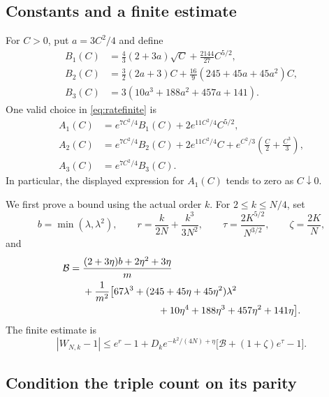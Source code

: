 \documentclass[11pt]{article}
\theoremstyle{definition}
\theoremstyle{remark}
\newcommand{\1}{\mathbf 1}
\begin{document}
\subsection{Constants and a finite estimate}

For $C>0$, put $a=3C^2/4$ and define
\begin{equation}\label{eq:rateconstantsB}
\begin{aligned}
B_1(C)&=\frac43(2+3a)\sqrt C+\frac{2144}{27}C^{5/2},\\
B_2(C)&=\frac32(2a+3)C
+\frac{16}{9}(245+45a+45a^2)C,\\
B_3(C)&=3(10a^3+188a^2+457a+141).
\end{aligned}
\end{equation}
One valid choice in \eqref{eq:ratefinite} is
\begin{equation}\label{eq:rateconstantsA}
\begin{aligned}
A_1(C)&=e^{7C^2/4}B_1(C)+2e^{11C^2/4}C^{5/2},\\
A_2(C)&=e^{7C^2/4}B_2(C)+2e^{11C^2/4}C
+e^{C^2/3}\left(\frac C2+\frac{C^3}{3}\right),\\
A_3(C)&=e^{7C^2/4}B_3(C).
\end{aligned}
\end{equation}
In particular, the displayed expression for $A_1(C)$ tends to zero as $C\downarrow0$.

We first prove a bound using the actual order $k$. For $2\le k\le N/4$, set
\[
b=\min(\lambda,\lambda^2),\qquad
r=\frac{k}{2N}+\frac{k^3}{3N^2},\qquad
\tau=\frac{2K^{5/2}}{N^{3/2}},\qquad\zeta=\frac{2K}{N},
\]
and
\begin{equation}\label{eq:rateB}
\begin{aligned}
\mathcal B={}&\frac{(2+3\eta)b+2\eta^2+3\eta}{m}\\
&+\frac{1}{m^2}\bigl[67\lambda^3+(245+45\eta+45\eta^2)\lambda^2\\
&\hspace{27mm}+10\eta^4+188\eta^3+457\eta^2+141\eta\bigr].
\end{aligned}
\end{equation}
The finite estimate is
\begin{equation}\label{eq:ratelocal}
|W_{N,k}-1|
\le e^r-1+D_ke^{-k^2/(4N)+\eta}
\bigl[\mathcal B+(1+\zeta)e^\tau-1\bigr].
\end{equation}

\subsection{Condition the triple count on its parity}
\end{document}
